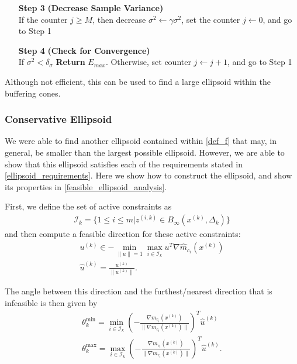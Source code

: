\documentclass{article}
\theoremstyle{case}
\newcommand{\xk}{{x^{(k)}}}
\newcommand{\dk}{\Delta_k}
\newcommand{\uk}{{u^{(k)}}}
\newcommand{\zik}{{z^{(i, k)}}}
\newcommand{\iik}{{\mathcal I_{k}}}
\newcommand{\huk}{{{\hat u}^{(k)}}}
\newcommand{\hgik}{{\frac{\nabla m_{c_i}(\xk)}{\|\nabla m_{c_i}(\xk)\|}}}
\newcommand{\hgmcik}{{\nabla \hat m_{c_i}(\xk)}}
\newcommand{\tr}{{ B_{\infty}\left(\xk, \dk\right) }}
\begin{document}
\begin{algorithm}[H]
\begin{itemize}
        \item[\textbf{Step 3}] \textbf{(Decrease Sample Variance)} \\
            If the counter $j \ge M$, then
	    	decrease $\sigma^2 \gets \gamma \sigma^2$,
	    	set the counter $j\gets 0$, and
	    	go to Step 1
            
        \item[\textbf{Step 4}] \textbf{(Check for Convergence)} \\
	    If $\sigma^2 < \delta_{\sigma}$ \textbf{Return} $E_{max}$.
	    Otherwise, 
        		set counter $j \gets j + 1$, and
        		go to Step 1
    \end{itemize}
\end{algorithm}

Although not efficient, this can be used to find a large ellipsoid within the buffering cones.


\subsubsection{Conservative Ellipsoid}

We were able to find another ellipsoid contained within \cref{def_f} that may, in general, be smaller than the largest possible ellipsoid.
However, we are able to show that this ellipsoid satisfies each of the requirements stated in \cref{ellipsoid_requirements}.
Here we show how to construct the ellipsoid, and show its properties in \cref{feasible_ellipsoid_analysis}.

First, we define the set of active constraints as
\begin{align}
\iik = \{1\le i \le m | \zik \in \tr \} \label{def_i}
\end{align}
and then compute a feasible direction for these active constraints:
\begin{align}
\uk \in -\min_{\|u\| = 1} \max_{i \in \iik} u^T\hgmcik\label{def_u} \\
\huk = \frac {\uk} {\| \uk\|} \label{def_hu}.
\end{align}


The angle between this direction and the furthest/nearest direction that is infeasible is then given by
\begin{align}
\theta^{\text{min}}_k = \min_{i \in \iik} (-\hgik)^T \huk \label{def_theta_k_min} \\
\theta^{\text{max}}_k = \max_{i \in \iik} (-\hgik)^T \huk \label{def_theta_k_max}.
\end{align}
\end{document}
